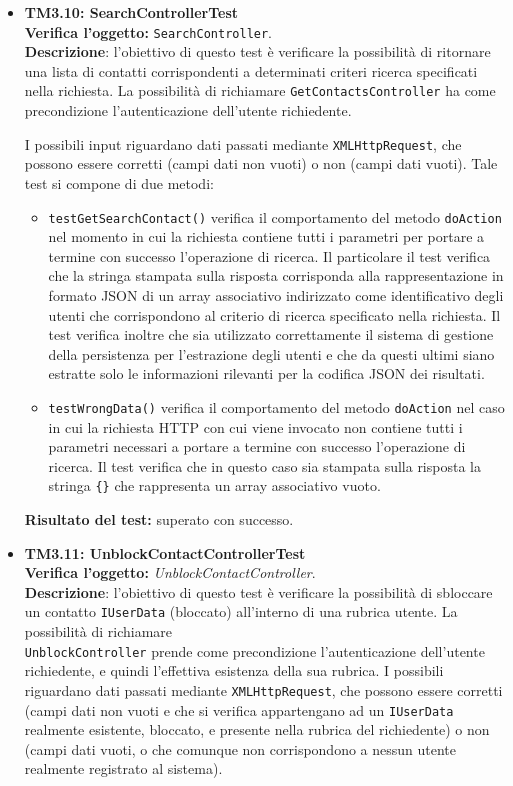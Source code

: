 \begin{itemize}
\item \textbf{TM3.10: SearchControllerTest}\\
\textbf{Verifica l'oggetto:} \texttt{SearchController}.\\
\textbf{Descrizione}: l'obiettivo di questo test è verificare la possibilità di ritornare una lista di contatti corrispondenti a determinati criteri ricerca specificati nella richiesta. La possibilità di richiamare \texttt{GetContactsController} ha come precondizione l'autenticazione dell'utente richiedente. 

I possibili input riguardano dati passati mediante \texttt{XMLHttpRequest}, che possono essere corretti (campi dati non vuoti) o non (campi dati vuoti). %
Tale test si compone di due metodi:
\begin{itemize}

\item \texttt{testGetSearchContact()} verifica il comportamento del metodo \texttt{doAction} nel momento in cui la richiesta contiene tutti i parametri per portare a termine con successo l'operazione di ricerca. Il particolare il test verifica che la stringa stampata sulla risposta corrisponda alla rappresentazione in formato JSON di un array associativo indirizzato come identificativo degli utenti che corrispondono al criterio di ricerca specificato nella richiesta. Il test verifica inoltre che sia utilizzato correttamente il sistema di gestione della persistenza per l'estrazione degli utenti e che da questi ultimi siano estratte solo le informazioni rilevanti per la codifica JSON dei risultati.

\item \texttt{testWrongData()} verifica il comportamento del metodo \texttt{doAction} nel caso in cui la richiesta HTTP con cui viene invocato non contiene tutti i parametri necessari a portare a termine con successo l'operazione di ricerca. Il test verifica che in questo caso sia stampata sulla risposta la stringa \texttt{\{\}} che rappresenta un array associativo vuoto.
\end{itemize}
\textbf{Risultato del test:} superato con successo.


\item \textbf{TM3.11: UnblockContactControllerTest}\\
\textbf{Verifica l'oggetto:} \textit{UnblockContactController}.\\
\textbf{Descrizione}: l'obiettivo di questo test è verificare la possibilità di sbloccare un contatto \texttt{IUserData} (bloccato) all'interno di una rubrica utente. La possibilità di richiamare\\ \texttt{UnblockController} prende come precondizione l'autenticazione dell'utente richiedente, e quindi l'effettiva esistenza della sua rubrica.
I possibili  riguardano dati passati mediante \texttt{XMLHttpRequest}, che possono essere corretti (campi dati non vuoti e che si verifica appartengano ad un \texttt{IUserData} realmente esistente, bloccato, e presente nella rubrica del richiedente) o non (campi dati vuoti, o che comunque non corrispondono a nessun utente realmente registrato al sistema). %


\end{itemize}
